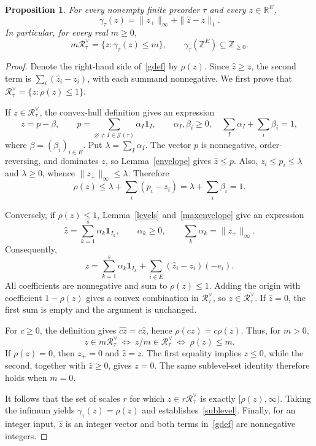 \documentclass[11pt,reqno]{amsart}
\numberwithin{equation}{section}
\newtheorem{proposition}[theorem]{Proposition}
\theoremstyle{definition}
\theoremstyle{remark}
\theoremstyle{definition}
\newcommand{\Rpoly}[1]{\mathcal R_{#1}^{\vee}}
\begin{document}
\begin{proposition}\label{gauge}
For every nonempty finite preorder $\tau$ and every $z\in\mathbb R^E$,
\begin{equation}\label{gdef}
 \gamma_\tau(z)=\|z_+\|_\infty+\|\widehat z-z\|_1.
\end{equation}
In particular, for every real $m\ge0$,
\begin{equation}\label{sublevel}
 m\Rpoly{\tau}=\{z:\gamma_\tau(z)\le m\},
 \qquad \gamma_\tau(\mathbb Z^E)\subseteq\mathbb Z_{\ge0}.
\end{equation}
\end{proposition}
\begin{proof}
Denote the right-hand side of~\eqref{gdef} by $\rho(z)$. Since $\widehat z\ge z$, the second term is $\sum_i(\widehat z_i-z_i)$, with each summand nonnegative. We first prove that $\Rpoly{\tau}=\{z:\rho(z)\le1\}$.

If $z\in\Rpoly{\tau}$, the convex-hull definition gives an expression
\[
 z=p-\beta,\qquad
 p=\sum_{\varnothing\ne I\in\mathcal J(\tau)}\alpha_I\mathbf1_I,
 \qquad \alpha_I,\beta_i\ge0,\quad
 \sum_I\alpha_I+\sum_i\beta_i=1,
\]
where $\beta=(\beta_i)_{i\in E}$. Put $\lambda=\sum_I\alpha_I$. The vector $p$ is nonnegative, order-reversing, and dominates $z$, so Lemma~\ref{envelope} gives $\widehat z\le p$. Also, $z_i\le p_i\le\lambda$ and $\lambda\ge0$, whence $\|z_+\|_\infty\le\lambda$. Therefore
\[
 \rho(z)\le\lambda+\sum_i(p_i-z_i)
          =\lambda+\sum_i\beta_i=1.
\]

Conversely, if $\rho(z)\le1$, Lemma~\ref{levels} and~\eqref{maxenvelope} give an expression
\[
 \widehat z=\sum_{k=1}^s\alpha_k\mathbf1_{I_k},
 \qquad \alpha_k\ge0,\qquad
 \sum_k\alpha_k=\|z_+\|_\infty.
\]
Consequently,
\[
 z=\sum_{k=1}^s\alpha_k\mathbf1_{I_k}
       +\sum_{i\in E}(\widehat z_i-z_i)(-e_i).
\]
All coefficients are nonnegative and sum to $\rho(z)\le1$. Adding the origin with coefficient $1-\rho(z)$ gives a convex combination in $\Rpoly{\tau}$, so $z\in\Rpoly{\tau}$. If $\widehat z=0$, the first sum is empty and the argument is unchanged.

For $c\ge0$, the definition gives $\widehat{cz}=c\widehat z$, hence $\rho(cz)=c\rho(z)$. Thus, for $m>0$,
\[
 z\in m\Rpoly{\tau}
 \ \Longleftrightarrow\ z/m\in\Rpoly{\tau}
 \ \Longleftrightarrow\ \rho(z)\le m.
\]
If $\rho(z)=0$, then $z_+=0$ and $\widehat z=z$. The first equality implies $z\le0$, while the second, together with $\widehat z\ge0$, gives $z=0$. The same sublevel-set identity therefore holds when $m=0$.

It follows that the set of scales $r$ for which $z\in r\Rpoly{\tau}$ is exactly $[\rho(z),\infty)$. Taking the infimum yields $\gamma_\tau(z)=\rho(z)$ and establishes~\eqref{sublevel}. Finally, for an integer input, $\widehat z$ is an integer vector and both terms in~\eqref{gdef} are nonnegative integers.
\end{proof}
\end{document}
